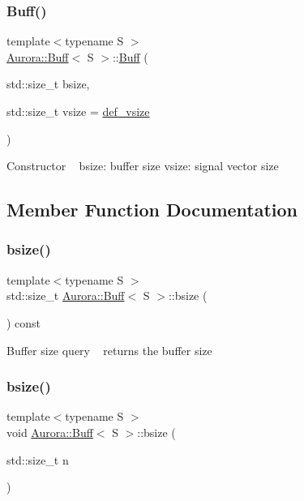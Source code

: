 \subsubsection{\texorpdfstring{Buff()}{Buff()}}
{\footnotesize\ttfamily template$<$typename S $>$ \\
\hyperlink{class_aurora_1_1_buff}{Aurora\+::\+Buff}$<$ S $>$\+::\hyperlink{class_aurora_1_1_buff}{Buff} (\begin{DoxyParamCaption}\item[{std\+::size\+\_\+t}]{bsize,  }\item[{std\+::size\+\_\+t}]{vsize = {\ttfamily \hyperlink{namespace_aurora_afaaddf667a06e7ce23c667a8b7295263}{def\+\_\+vsize}} }\end{DoxyParamCaption})\hspace{0.3cm}{\ttfamily [inline]}}

Constructor ~\newline
bsize\+: buffer size vsize\+: signal vector size 

\subsection{Member Function Documentation}
\mbox{\label{class_aurora_1_1_buff_a8e1a05d615af725bce21de0fb10735a2}} 
\subsubsection{\texorpdfstring{bsize()}{bsize()}\hspace{0.1cm}{\footnotesize\ttfamily [1/2]}}
{\footnotesize\ttfamily template$<$typename S $>$ \\
std\+::size\+\_\+t \hyperlink{class_aurora_1_1_buff}{Aurora\+::\+Buff}$<$ S $>$\+::bsize (\begin{DoxyParamCaption}{ }\end{DoxyParamCaption}) const\hspace{0.3cm}{\ttfamily [inline]}}

Buffer size query ~\newline
returns the buffer size \mbox{\label{class_aurora_1_1_buff_ac5b2377e34eb7ff03261e43e907ef0d2}} 
\subsubsection{\texorpdfstring{bsize()}{bsize()}\hspace{0.1cm}{\footnotesize\ttfamily [2/2]}}
{\footnotesize\ttfamily template$<$typename S $>$ \\
void \hyperlink{class_aurora_1_1_buff}{Aurora\+::\+Buff}$<$ S $>$\+::bsize (\begin{DoxyParamCaption}\item[{std\+::size\+\_\+t}]{n }\end{DoxyParamCaption})\hspace{0.3cm}{\ttfamily [inline]}}

